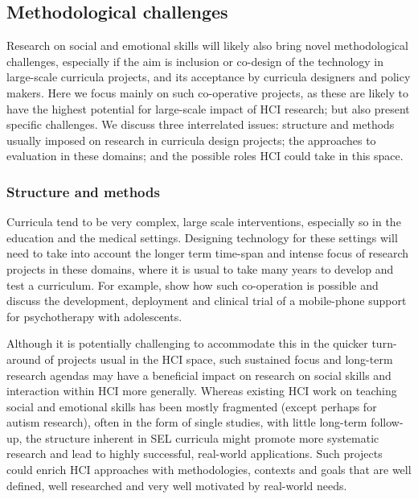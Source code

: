 \documentclass[prodmode,acmtochi]{acmsmall}
\begin{document}
\subsection{Methodological challenges}
Research on social and emotional skills will likely also bring  novel methodological challenges, especially if the aim is inclusion or co-design of the technology in large-scale curricula projects, and its acceptance by curricula designers and policy makers. Here we focus mainly on such co-operative projects, as these are likely to have the highest potential for large-scale impact of HCI research; but also present specific challenges. We discuss three interrelated issues: structure and methods usually imposed on research in curricula design projects; the approaches to evaluation in these domains; and the possible roles HCI could take in this space. 

\subsubsection{Structure and methods}
Curricula tend to be very complex, large scale interventions, especially so in the education and the medical settings. Designing technology for these settings will need to take into account the longer term time-span and intense focus of research projects in these domains, where it is usual to take many years to develop and test a curriculum. For example,  show how such co-operation is possible and discuss the development, deployment and clinical trial of a mobile-phone support for psychotherapy with adolescents. 

Although it is potentially challenging to accommodate this in the quicker turn-around of projects usual in the HCI space, such sustained focus and long-term research agendas may have a beneficial impact on research on social skills and interaction within HCI more generally. Whereas existing HCI work on teaching social and emotional skills has been mostly fragmented (except perhaps for autism research), often in the form of single studies, with little long-term follow-up, the structure inherent in SEL curricula might promote more systematic research and lead to highly successful, real-world applications. Such projects could enrich HCI approaches with methodologies, contexts and goals that are well defined, well researched and very well motivated by real-world needs. 
\end{document}

